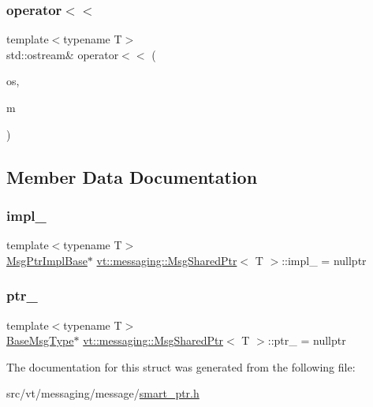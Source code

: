 \subsubsection{\texorpdfstring{operator$<$$<$}{operator<<}}
{\footnotesize\ttfamily template$<$typename T$>$ \\
std\+::ostream\& operator$<$$<$ (\begin{DoxyParamCaption}\item[{std\+::ostream \&}]{os,  }\item[{\hyperlink{structvt_1_1messaging_1_1_msg_shared_ptr}{Msg\+Shared\+Ptr}$<$ T $>$ const \&}]{m }\end{DoxyParamCaption})\hspace{0.3cm}{\ttfamily [friend]}}



\subsection{Member Data Documentation}
\mbox{\label{structvt_1_1messaging_1_1_msg_shared_ptr_aa0cf96203c13d77d691888c852bc333e}} 
\subsubsection{\texorpdfstring{impl\+\_\+}{impl\_}}
{\footnotesize\ttfamily template$<$typename T$>$ \\
\hyperlink{structvt_1_1messaging_1_1_msg_ptr_impl_base}{Msg\+Ptr\+Impl\+Base}$\ast$ \hyperlink{structvt_1_1messaging_1_1_msg_shared_ptr}{vt\+::messaging\+::\+Msg\+Shared\+Ptr}$<$ T $>$\+::impl\+\_\+ = nullptr\hspace{0.3cm}{\ttfamily [private]}}

\mbox{\label{structvt_1_1messaging_1_1_msg_shared_ptr_aac5218a8b39004946a523ac4a729a3da}} 
\subsubsection{\texorpdfstring{ptr\+\_\+}{ptr\_}}
{\footnotesize\ttfamily template$<$typename T$>$ \\
\hyperlink{structvt_1_1messaging_1_1_msg_shared_ptr_a778cb9ec8919e4a309d28ed345ac318d}{Base\+Msg\+Type}$\ast$ \hyperlink{structvt_1_1messaging_1_1_msg_shared_ptr}{vt\+::messaging\+::\+Msg\+Shared\+Ptr}$<$ T $>$\+::ptr\+\_\+ = nullptr\hspace{0.3cm}{\ttfamily [private]}}



The documentation for this struct was generated from the following file\+:\begin{DoxyCompactItemize}
\item 
src/vt/messaging/message/\hyperlink{smart__ptr_8h}{smart\+\_\+ptr.\+h}\end{DoxyCompactItemize}
